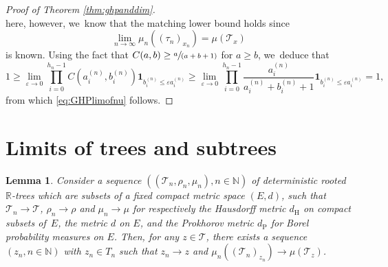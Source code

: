 \documentclass[11pt]{article}
\newcommand{\spfrac}[2]{\sfrac{#1}{(#2)}}
\newcommand{\R}{{\mathbb{R}}}
\newcommand{\N}{\mathbb{N}}
\newcommand{\T}{\mathcal{T}}\let\CRT\T\let\tbr\T
\newtheorem{lem}[thm]{Lemma}
\theoremstyle{definition}
\begin{document}
\begin{proof}[Proof of Theorem \ref{thm:ghpanddim}]
\[\]
here, however, we~know that the matching lower bound holds since\vspace*{-3pt}
\[
\lim_{n \to \infty} \mu_n((\tau_n)_{x_n}) = \mu(\mathcal{T}_x)
\]
is known. Using the fact that $C(a,b) \geq \spfrac{a}{a+b+1}$ for $a \geq b$, we~deduce that\vspace*{-3pt}
\[
1\geq \lim_{\varepsilon \to 0} \prod_{i=0}^{h_n-1} C(a_i^{(n)}, b_i^{(n)})\mathbf{1}_{b_i^{(n)} \leq \varepsilon a_i^{(n)}} \geq \lim_{\varepsilon \to 0} \prod_{i=0}^{h_n-1} \frac{a_i^{(n)}}{a_i^{(n)}+b_i^{(n)}+1}\mathbf{1}_{b_i^{(n)} \leq \varepsilon a_i^{(n)}} = 1,
\]
from which \eqref{eq:GHPlimofnu} follows.
\end{proof}

\section{Limits of trees and subtrees}

\begin{lem}\label{lemma:annoyingmetricthing}
Consider a sequence $((\T_n,\rho_n,\mu_n),n\in\N)$ of deterministic rooted $\R$\nobreakdash-trees which are subsets of a fixed compact metric space $(E,d)$, such that $\T_n\to \T$, $\rho_n\to \rho$ and $\mu_n\to\mu$ for respectively the Hausdorff metric $d_{\mathrm{H}}$ on compact subsets of~$E$, the metric $d$ on $E$, and the Prokhorov metric $d_{\mathrm{P}}$ for Borel probability measures on $E$.
Then, for any $z\in\T$, there exists a sequence $(z_n,n\in\N)$ with $z_n\in T_n$ such that $z_n\to z$ and $\mu_n((\T_n)_{z_n}) \to \mu(\T_z)$.
\end{lem}
\end{document}
